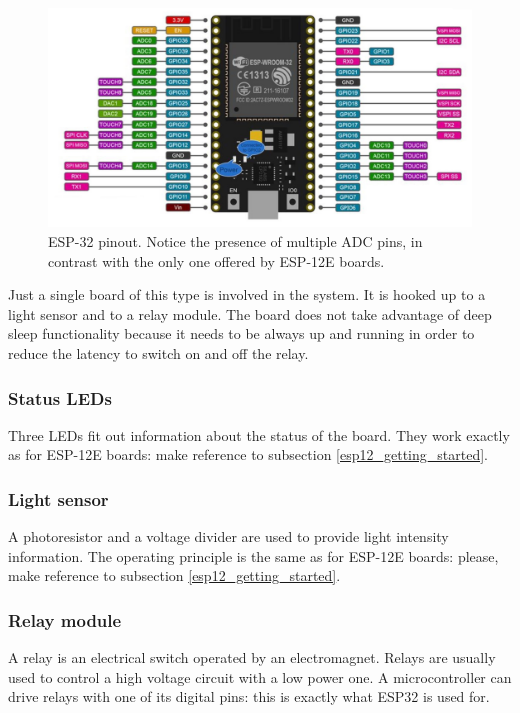 \begin{figure}[H]
	\begin{center}
		\includegraphics[width=\textwidth]{./pictures/ESP-32_pinout.JPG}
		\caption{ESP-32 pinout. Notice the presence of multiple ADC pins, in contrast with the only one offered by ESP-12E boards.}
		\label{esp32_pinout}
	\end{center}
\end{figure}

\noindent
Just a single board of this type is involved in the system. It is hooked up to a light sensor and to a relay module. The board does not take advantage of deep sleep functionality because it needs to be always up and running in order to reduce the latency to switch on and off the relay.

\subsubsection{Status LEDs}
Three LEDs fit out information about the status of the board. They work exactly as for ESP-12E boards: make reference to subsection \ref{esp12_getting_started}.

\subsubsection{Light sensor}
A photoresistor and a voltage divider are used to provide light intensity information. The operating principle is the same as for ESP-12E boards: please, make reference to subsection \ref{esp12_getting_started}.

\subsubsection{Relay module}
A relay is an electrical switch operated by an electromagnet. Relays are usually used to control a high voltage circuit with a low power one. A microcontroller can drive relays with one of its digital pins: this is exactly what ESP32 is used for.

